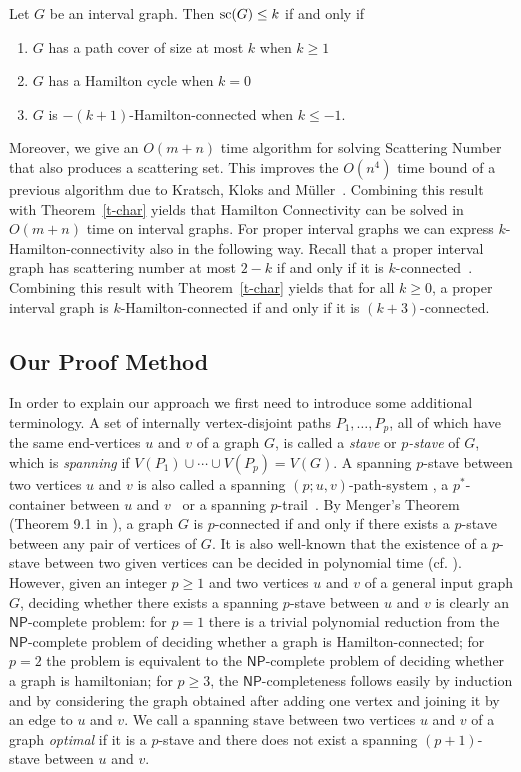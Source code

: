 \documentclass{llncs}
\DeclareMathOperator{\scat}{{\rm sc}}
\newcommand{\NP}{{\mathsf{NP}}}
\begin{document}
\begin{theorem}\label{t-char}
Let $G$ be an interval graph. Then $\scat(G)\leq k$ if and only if\\[-15pt]
\begin{enumerate}[\quad(i)]
\item $G$ has a path cover of size at most $k$ when $k\geq 1$
\item $G$ has a Hamilton cycle when $k=0$
\item $G$ is $-(k+1)$-Hamilton-connected when $k\leq -1$.
\end{enumerate}
\end{theorem}
Moreover, we give an $O(m+n)$ time algorithm for solving {\sc Scattering Number} that also produces a scattering set. This improves the $O(n^4)$ time bound of a previous algorithm due to Kratsch, Kloks and M\"uller~\cite{KKM94}. Combining this result with Theorem~\ref{t-char} yields that {\sc Hamilton Connectivity} can be solved in $O(m+n)$ time on interval graphs.
For proper interval graphs we can express $k$-Hamilton-connectivity also in the following way.
 Recall that a proper interval graph has scattering number at most $2-k$ if and only if it is $k$-connected~\cite{CC96}.
Combining this result with Theorem~\ref{t-char} yields that for all $k\geq 0$, a proper interval graph is $k$-Hamilton-connected if and only if it is $(k+3)$-connected.


\subsection{Our Proof Method}\label{s-method}

In order to explain our approach we first need to introduce some additional terminology.
A set of internally vertex-disjoint paths $P_1,\ldots,P_p$, all of which have the same  
end-vertices $u$ and $v$ of a graph $G$, is called a {\it stave} or {\it $p$-stave} of $G$, which is {\it spanning} if $V(P_1)\cup \cdots \cup V(P_p)=V(G)$.
A spanning $p$-stave between two vertices $u$ and $v$ is also called  
a spanning $(p;u,v)$-path-system \cite{CCLLW}, a $p^*$-container between $u$ and $v$~\cite{Hs94,LHH07} or a spanning $p$-trail~\cite{LW}.
 By Menger's Theorem (Theorem 9.1 in \cite{BM08}), a graph $G$ is $p$-connected if and only if there exists a $p$-stave between any pair of vertices of $G$. It is also well-known that the existence of a $p$-stave between two given vertices can be decided in polynomial time (cf. \cite{BM08}). However, given an integer $p\ge 1$ and two vertices $u$ and $v$ of a general input graph $G$, deciding whether there exists a spanning $p$-stave between $u$ and $v$ is clearly an $\NP$-complete problem:  for $p=1$ there is a trivial polynomial reduction from the $\NP$-complete problem of deciding whether a graph is Hamilton-connected; for $p=2$ the problem is equivalent to the $\NP$-complete problem of deciding whether a graph is hamiltonian; for $p\ge 3$, the $\NP$-completeness follows easily by induction and by considering the graph obtained after adding one vertex and joining it by an edge to $u$ and $v$. 
We call a spanning stave between two vertices $u$ and $v$ of a graph {\em optimal\/} if it is a $p$-stave and there does not exist a spanning $(p+1)$-stave between $u$ and $v$.
\end{document}
